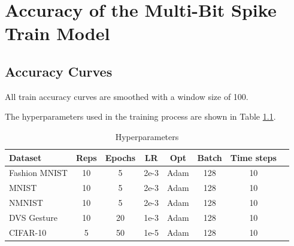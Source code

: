 \chapter{Accuracy of the Multi-Bit Spike Train Model}
\label{appendix:accuracy}

\section{Accuracy Curves}
\label{appendix:accuracy_curves}

    All train accuracy curves are smoothed with a window size of 100.

    The hyperparameters used in the training process are shown in Table \ref{tab:hyperparameters_accuracy}.

    \begin{table}[H]
        \begin{tabularx}{\textwidth}{|X|c|c|c|c|c|c|c|}
            \toprule
            Dataset & Reps & Epochs & LR & Opt & Batch & Time steps \\
            \midrule
            Fashion MNIST & 10 & 5 & 2e-3 & Adam & 128 & 10 \\
            MNIST & 10 & 5 & 2e-3 & Adam & 128 & 10 \\
            NMNIST & 10 & 5 & 2e-3 & Adam & 128 & 10 \\
            DVS Gesture & 10 & 20 & 1e-3 & Adam & 128 & 10 \\
            CIFAR-10 & 5 & 50 & 1e-5 & Adam & 128 & 10 \\
            \bottomrule
        \end{tabularx}
        \caption{Hyperparameters}
        \label{tab:hyperparameters_accuracy}
    \end{table}

